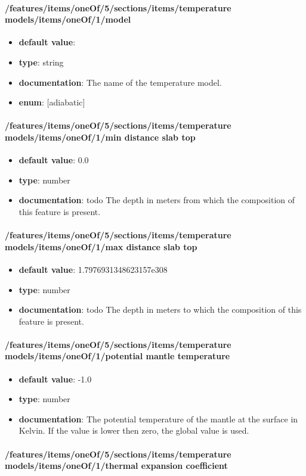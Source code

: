 \paragraph{/features/items/oneOf/5/sections/items/temperature models/items/oneOf/1/model}
\begin{itemize}\item {\bf default value}: 
\item {\bf type}: string
\item {\bf documentation}: The name of the temperature model.
\item {\bf enum}: [adiabatic]\end{itemize}\paragraph{/features/items/oneOf/5/sections/items/temperature models/items/oneOf/1/min distance slab top}
\begin{itemize}\item {\bf default value}: 0.0
\item {\bf type}: number
\item {\bf documentation}: todo The depth in meters from which the composition of this feature is present.
\end{itemize}\paragraph{/features/items/oneOf/5/sections/items/temperature models/items/oneOf/1/max distance slab top}
\begin{itemize}\item {\bf default value}: 1.7976931348623157e308
\item {\bf type}: number
\item {\bf documentation}: todo The depth in meters to which the composition of this feature is present.
\end{itemize}\paragraph{/features/items/oneOf/5/sections/items/temperature models/items/oneOf/1/potential mantle temperature}
\begin{itemize}\item {\bf default value}: -1.0
\item {\bf type}: number
\item {\bf documentation}: The potential temperature of the mantle at the surface in Kelvin. If the value is lower then zero, the global value is used.
\end{itemize}\paragraph{/features/items/oneOf/5/sections/items/temperature models/items/oneOf/1/thermal expansion coefficient}
